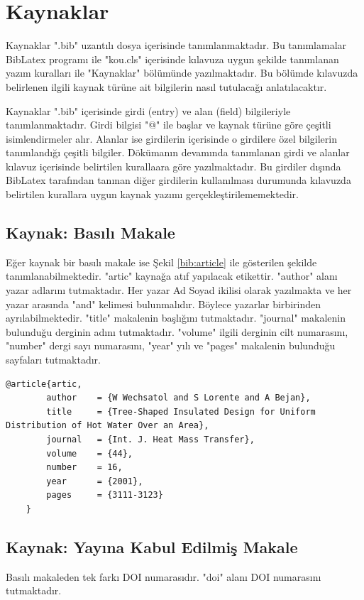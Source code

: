 \section{Kaynaklar}
Kaynaklar ".bib" uzantılı dosya içerisinde tanımlanmaktadır. Bu tanımlamalar BibLatex programı ile "kou.cls" içerisinde kılavuza uygun şekilde tanımlanan yazım kuralları ile "Kaynaklar" bölümünde yazılmaktadır. Bu bölümde kılavuzda belirlenen ilgili kaynak türüne ait bilgilerin nasıl tutulacağı anlatılacaktır. 

Kaynaklar ".bib" içerisinde girdi (entry) ve alan (field) bilgileriyle tanımlanmaktadır. Girdi bilgisi "@" ile başlar ve kaynak türüne göre çeşitli isimlendirmeler alır. Alanlar ise girdilerin içerisinde o girdilere özel bilgilerin tanımlandığı çeşitli bilgiler. Dökümanın devamında tanımlanan girdi ve alanlar kılavuz içerisinde belirtilen kurallaara göre yazılmaktadır. Bu girdiler dışında BibLatex tarafından tanınan diğer girdilerin kullanılması durumunda kılavuzda belirtilen kurallara uygun kaynak yazımı gerçekleştirilememektedir.

\subsection{Kaynak: Basılı Makale}
Eğer kaynak bir basılı makale ise Şekil \ref{bib:article} ile gösterilen şekilde tanımlanabilmektedir. "artic" kaynağa atıf yapılacak etikettir. "author" alanı yazar adlarını tutmaktadır. Her yazar Ad Soyad ikilisi olarak yazılmakta ve her yazar arasında "and" kelimesi bulunmalıdır. Böylece yazarlar birbirinden ayrılabilmektedir. "title" makalenin başlığını tutmaktadır. "journal" makalenin bulunduğu derginin adını tutmaktadır. "volume" ilgili derginin cilt numarasını, "number" dergi sayı numarasını, "year" yılı ve "pages" makalenin bulunduğu sayfaları tutmaktadır.

\begin{lstlisting}[language={[LaTeX]{TeX}}, label=bib:article, caption=Kaynak basılı bir makale ise]
	@article{artic,
		author    = {W Wechsatol and S Lorente and A Bejan},
		title     = {Tree-Shaped Insulated Design for Uniform Distribution of Hot Water Over an Area},
		journal   = {Int. J. Heat Mass Transfer},
		volume    = {44},
		number    = 16,
		year      = {2001},
		pages     = {3111-3123}
	}	
\end{lstlisting}

\subsection{Kaynak: Yayına Kabul Edilmiş Makale}
Basılı makaleden tek farkı DOI numarasıdır. "doi" alanı DOI numarasını tutmaktadır.

